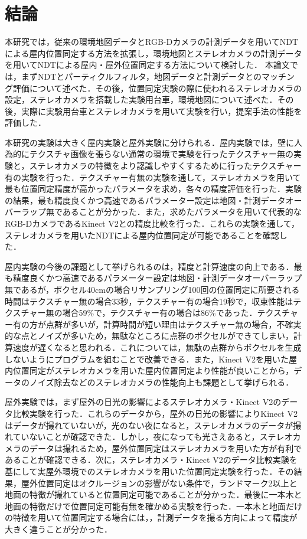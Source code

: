 \chapter{結論}
本研究では，従来の環境地図データとRGB-Dカメラの計測データを用いてNDTによる屋内位置同定する方法を拡張し，環境地図とステレオカメラの計測データを用いてNDTによる屋内・屋外位置同定する方法について検討した．
本論文では，まずNDTとパーティクルフィルタ，地図データと計測データとのマッチング評価について述べた．その後，位置同定実験の際に使われるステレオカメラの設定，ステレオカメラを搭載した実験用台車，環境地図について述べた．その後，実際に実験用台車とステレオカメラを用いて実験を行い，提案手法の性能を評価した．\par
本研究の実験は大きく屋内実験と屋外実験に分けられる．屋内実験では，壁に人為的にテクスチャ画像を張らない通常の環境で実験を行ったテクスチャー無の実験と，ステレオカメラの特徴をより認識しやすくするために行ったテクスチャー有の実験を行った．テクスチャー有無の実験を通して，ステレオカメラを用いて最も位置同定精度が高かったパラメータを求め，各々の精度評価を行った．実験の結果，最も精度良くかつ高速であるパラメーター設定は地図・計測データオーバーラップ無であることが分かった．また，求めたパラメータを用いて代表的なRGB-DカメラであるKinect V2との精度比較を行った．これらの実験を通して，ステレオカメラを用いたNDTによる屋内位置同定が可能であることを確認した．

屋内実験の今後の課題として挙げられるのは，精度と計算速度の向上である．最も精度良くかつ高速であるパラメーター設定は地図・計測データオーバーラップ無であるが，ボクセル40cmの場合リサンプリング100回の位置同定に所要される時間はテクスチャー無の場合33秒，テクスチャー有の場合19秒で，収束性能はテクスチャー無の場合59\%で，テクスチャー有の場合は86\%であった．テクスチャー有の方が点群が多いが，計算時間が短い理由はテクスチャー無の場合，不確実的な点とノイズが多いため，無駄なところに点群のボクセルができてしまい，計算速度が遅くなると思われる．これについては，無駄の点群からボクセルを生成しないようにプログラムを組むことで改善できる．また，Kinect V2を用いた屋内位置同定がステレオカメラを用いた屋内位置同定より性能が良いことから，データのノイズ除去などのステレオカメラの性能向上も課題として挙げられる．

屋外実験では，まず屋外の日光の影響によるステレオカメラ・Kinect V2のデータ比較実験を行った．これらのデータから，屋外の日光の影響によりKinect V2はデータが撮れていないが，光のない夜になると，ステレオカメラのデータが撮れていないことが確認できた．しかし，夜になっても光さえあると，ステレオカメラのデータは撮れるため，屋外位置同定はステレオカメラを用いた方が有利であることが確認できる．次に，ステレオカメラ・Kinect V2のデータ比較実験を基にして実屋外環境でのステレオカメラを用いた位置同定実験を行った．その結果，屋外位置同定はオクルージョンの影響がない条件で，ランドマーク2以上と地面の特徴が撮れていると位置同定可能であることが分かった．最後に一本木と地面の特徴だけで位置同定可能有無を確かめる実験を行った．一本木と地面だけの特徴を用いて位置同定する場合には，，計測データを撮る方向によって精度が大きく違うことが分かった．

